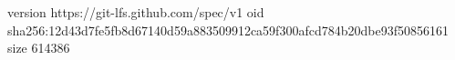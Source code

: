 version https://git-lfs.github.com/spec/v1
oid sha256:12d43d7fe5fb8d67140d59a883509912ca59f300afcd784b20dbe93f50856161
size 614386
